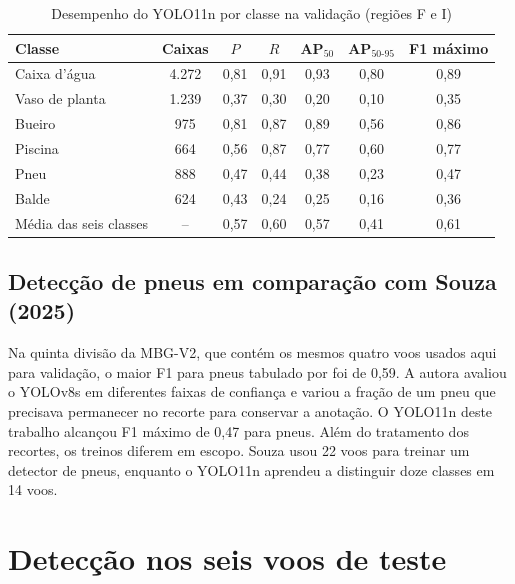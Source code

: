 \begin{table}[!htbp]
  \centering
  \caption{Desempenho do YOLO11n por classe na validação (regiões F e I)}
  \label{tab_detector}
  \begin{tabular}{lcccccc}
    \hline
    Classe & Caixas & $P$ & $R$ & AP$_{50}$ & AP$_{50\text{-}95}$ & F1 máximo \\
    \hline
    Caixa d'água & 4.272 & 0,81 & 0,91 & 0,93 & 0,80 & 0,89 \\
    Vaso de planta & 1.239 & 0,37 & 0,30 & 0,20 & 0,10 & 0,35 \\
    Bueiro & 975 & 0,81 & 0,87 & 0,89 & 0,56 & 0,86 \\
    Piscina & 664 & 0,56 & 0,87 & 0,77 & 0,60 & 0,77 \\
    Pneu & 888 & 0,47 & 0,44 & 0,38 & 0,23 & 0,47 \\
    Balde & 624 & 0,43 & 0,24 & 0,25 & 0,16 & 0,36 \\
    \hline
    Média das seis classes & -- & 0,57 & 0,60 & 0,57 & 0,41 & 0,61 \\
    \hline
  \end{tabular}
\end{table}

\subsection{Detecção de pneus em comparação com Souza (2025)}

Na quinta divisão da MBG-V2, que contém os mesmos quatro voos usados aqui para validação, o maior F1 para pneus tabulado por  foi de 0,59. A autora avaliou o YOLOv8s em diferentes faixas de confiança e variou a fração de um pneu que precisava permanecer no recorte para conservar a anotação. O YOLO11n deste trabalho alcançou F1 máximo de 0,47 para pneus. Além do tratamento dos recortes, os treinos diferem em escopo. Souza usou 22 voos para treinar um detector de pneus, enquanto o YOLO11n aprendeu a distinguir doze classes em 14 voos.

\section{Detecção nos seis voos de teste}
\label{sec_qualidade_teste}

